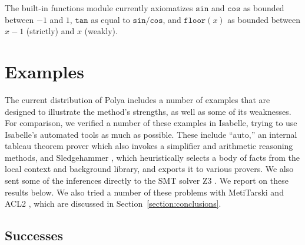 \documentclass[runningheds]{llncs}
\newcommand{\fn}[1]{\mathtt{#1}} \newcommand{\nroot}{\fn{root}}
\begin{document}
The built-in functions module currently axiomatizes $\fn{sin}$ and $\fn{cos}$ as bounded between $-1$ and $1$, $\fn{tan}$ as equal to $\fn{sin} / \fn{cos}$, and $\fn{floor}(x)$ as bounded between $x - 1$ (strictly) and $x$ (weakly).

\section{Examples}
\label{section:examples}

The current distribution of Polya includes a number of examples that are designed to illustrate the method's strengths, as well as some of its weaknesses. For comparison, we verified a number of these examples in Isabelle, trying to use Isabelle's automated tools as much as possible. These include ``auto,'' an internal tableau theorem prover which also invokes a simplifier and arithmetic reasoning methods, and Sledgehammer  \cite{meng:paulson:09} \cite{blanchette:et:al:11}, which heuristically selects a body of facts from the local context and background library, and exports it to various provers. We also sent some of the inferences directly to the SMT solver Z3 \cite{demoura:bjorner:08}. We report on these results below. We also tried a number of these problems with MetiTarski \cite{akbarpour:paulson:08} and ACL2 \cite{acl2}, which are discussed in Section~\ref{section:conclusions}.


\subsection{Successes}
\label{subsection:successes}
\end{document}
